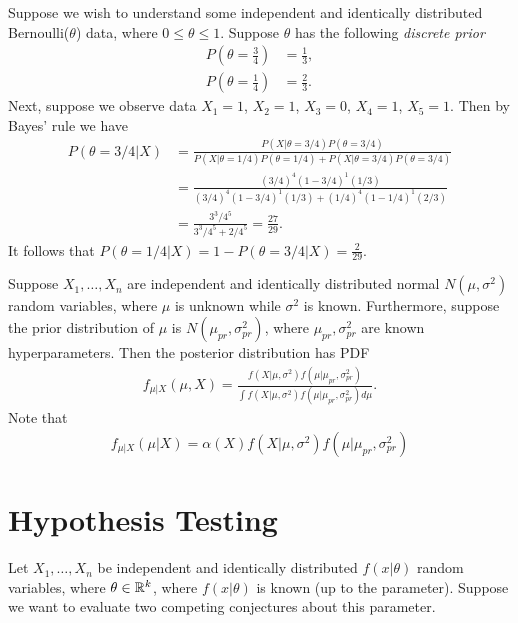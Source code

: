 \begin{exmp}
    Suppose we wish to understand some independent and identically distributed Bernoulli($\theta$) data, where $0 \leq \theta \leq 1$. Suppose $\theta$ has the following \emph{discrete prior}
    \begin{align*}
        P\left(\theta = \frac{3}{4}\right) &= \frac{1}{3}, \\
        P\left(\theta = \frac{1}{4}\right) &= \frac{2}{3}.
    \end{align*}
    Next, suppose we observe data $X_1 = 1$, $X_2 = 1$, $X_3 = 0$, $X_4 = 1$, $X_5 = 1$. Then by Bayes' rule we have
    \begin{align*}
        P\left(\theta = 3/4|X\right) &= \frac{P(X|\theta=3/4)P(\theta=3/4)}{P(X|\theta=1/4)P(\theta=1/4) + P(X|\theta=3/4)P(\theta=3/4)} \\
        &= \frac{\left(3/4\right)^{4}(1-3/4)^{1}(1/3)}{\left(3/4\right)^{4}(1-3/4)^{1}(1/3) + \left(1/4\right)^{4}(1-1/4)^{1}(2/3)} \\
        &= \frac{3^3/4^5}{3^3/4^5 + 2/4^5} = \frac{27}{29}.
    \end{align*}
    It follows that $P(\theta = 1/4|X) = 1-P(\theta=3/4|X) = \frac{2}{29}$.
\end{exmp}

\begin{exmp}
    Suppose $X_1, \ldots, X_n$ are independent and identically distributed normal $N(\mu, \sigma^2)$ random variables, where $\mu$ is unknown while $\sigma^2$ is known. Furthermore, suppose the prior distribution of $\mu$ is $N(\mu_{pr}, \sigma_{pr}^2)$, where $\mu_{pr},\sigma_{pr}^{2}$ are known hyperparameters. Then the posterior distribution has PDF
    \begin{align*}
        f_{\mu|X}(\mu, X) = \frac{f(X|\mu,\sigma^2)f(\mu|\mu_{pr},\sigma_{pr}^2)}{\int f(X|\mu,\sigma^2)f(\mu|\mu_{pr},\sigma_{pr}^2)d\mu}.
    \end{align*}
    Note that
    \begin{align*}
        f_{\mu|X}(\mu|X) = \alpha(X)f(X|\mu,\sigma^2)f(\mu|\mu_{pr},\sigma_{pr}^2)
    \end{align*}
\end{exmp}

\section{Hypothesis Testing}

Let $X_1, \ldots, X_n$ be independent and identically distributed $f(x|\theta)$ random variables, where $\theta \in \mathbb{R}^k$, where $f(x|\theta)$ is known (up to the parameter). Suppose we want to evaluate two competing conjectures about this parameter.

